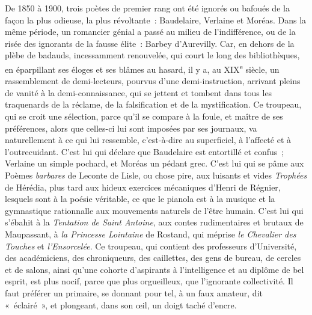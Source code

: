 \documentclass[french,twoside]{book} %
\begin{document}
De 1850 à 1900, trois poètes de premier rang ont été ignorés ou bafoués de la façon la plus odieuse, la plus révoltante : Baudelaire, Verlaine et Moréas. Dans la même période, un romancier génial a passé au milieu de l’indifférence, ou de la risée des ignorants de la fausse élite : Barbey d’Aurevilly. Car, en dehors de la plèbe de badauds, incessamment renouvelée, qui court le long des bibliothèques, en éparpillant ses éloges et ses blâmes au hasard, il y a, au XIX\textsuperscript{e} siècle, un rassemblement de demi-lecteurs, pourvus d’une demi-instruction, arrivant pleins de vanité à la demi-connaissance, qui se jettent et tombent dans tous les traquenards de la réclame, de la falsification et de la mystification. Ce troupeau, qui se croit une sélection, parce qu’il se compare à la foule, et maître de ses préférences, alors que celles-ci lui sont imposées par ses journaux, va naturellement à ce qui lui ressemble, c’est-à-dire au superficiel, à l’affecté et à l’outrecuidant. C’est lui qui déclare que Baudelaire est entortillé et confus ; Verlaine un simple pochard, et Moréas un pédant grec. C’est lui qui se pâme aux Poèmes {\itshape barbares} de Leconte de Lisle, ou chose pire, aux luisants et vides {\itshape Trophées} de Hérédia, plus tard aux hideux exercices mécaniques d’Henri de Régnier, lesquels sont à la poésie véritable, ce que le pianola est à la musique et la gymnastique rationnalle aux mouvements naturels de l’être humain. C’est lui qui s’ébahit à la {\itshape Tentation de Saint Antoine}, aux contes rudimentaires et brutaux de Maupassant, à {\itshape la Princesse Lointaine} de Rostand, qui méprise {\itshape le Chevalier des Touches} et {\itshape l’Ensorcelée}. Ce troupeau, qui contient des professeurs d’Université, des académiciens, des chroniqueurs, des caillettes, des gens de bureau, de cercles et de salons, ainsi qu’une cohorte d’aspirants à l’intelligence et au diplôme de bel esprit, est plus nocif, parce que plus orgueilleux, que l’ignorante collectivité. Il faut préférer un primaire, se donnant pour tel, à un faux amateur, dit « éclairé », et plongeant, dans son œil, un doigt taché d’encre.\par
\end{document}
